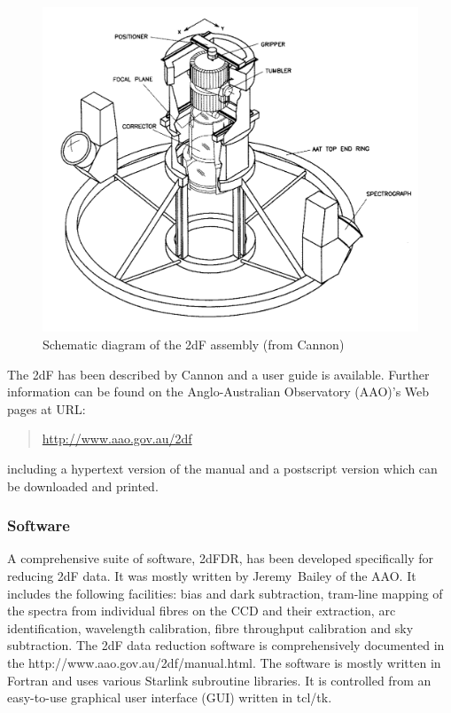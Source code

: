 \documentclass[chapters,twoside,11pt]{starlink}
\begin{document}
\begin{figure}[htbp]
   \centering
   \includegraphics[totalheight=6in]{sc14_2df}
   \caption[Schematic diagram of the 2dF assembly]{Schematic diagram of
    the 2dF assembly (from Cannon\cite{CANNON97})
   \label{2DF_SCHEMATIC} }
\end{figure}

The 2dF has been described by Cannon\cite{CANNON97} and a user
guide is available\cite{BAILEY97}.  Further information can be found
on the Anglo-Australian Observatory (AAO)'s Web pages at URL:

\begin{quote}
\url{http://www.aao.gov.au/2df}
\end{quote}

including a hypertext version of the manual and a postscript version
which can be downloaded and printed.

\subsubsection{\label{2DF_S}Software}

A comprehensive suite of software, 2dFDR, has been developed specifically
for reducing 2dF data.  It was mostly written by Jeremy~Bailey of the
AAO.  It includes the following facilities: bias and dark subtraction,
tram-line mapping of the spectra from individual fibres on the CCD and
their extraction, arc identification, wavelength calibration, fibre
throughput calibration and sky subtraction.  The 2dF data reduction
software is comprehensively documented in the
{http://www.aao.gov.au/2df/manual.html}\cite{BAILEY97}.
The software is mostly written in Fortran and uses various Starlink
subroutine libraries.  It is controlled from an easy-to-use graphical
user interface (GUI) written in tcl/tk.
\end{document}
